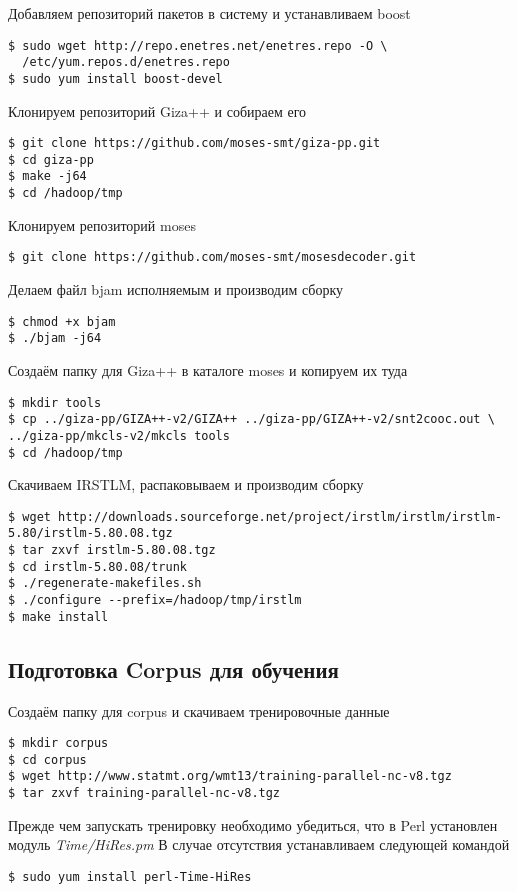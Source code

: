 Добавляем репозиторий пакетов в систему и устанавливаем boost
\begin{lstlisting}
$ sudo wget http://repo.enetres.net/enetres.repo -O \
  /etc/yum.repos.d/enetres.repo
$ sudo yum install boost-devel
\end{lstlisting}

Клонируем репозиторий Giza++ и собираем его
\begin{lstlisting}
$ git clone https://github.com/moses-smt/giza-pp.git
$ cd giza-pp
$ make -j64
$ cd /hadoop/tmp
\end{lstlisting}

Клонируем репозиторий moses
\begin{lstlisting}
$ git clone https://github.com/moses-smt/mosesdecoder.git
\end{lstlisting}
Делаем файл bjam исполняемым и производим сборку
\begin{lstlisting}
$ chmod +x bjam
$ ./bjam -j64
\end{lstlisting}

Создаём папку для Giza++ в каталоге moses и копируем их туда
\begin{lstlisting}
$ mkdir tools
$ cp ../giza-pp/GIZA++-v2/GIZA++ ../giza-pp/GIZA++-v2/snt2cooc.out \
../giza-pp/mkcls-v2/mkcls tools
$ cd /hadoop/tmp
\end{lstlisting}

Скачиваем IRSTLM, распаковываем и производим сборку
\begin{lstlisting}
$ wget http://downloads.sourceforge.net/project/irstlm/irstlm/irstlm-5.80/irstlm-5.80.08.tgz
$ tar zxvf irstlm-5.80.08.tgz
$ cd irstlm-5.80.08/trunk
$ ./regenerate-makefiles.sh
$ ./configure --prefix=/hadoop/tmp/irstlm
$ make install
\end{lstlisting}

\subsection{Подготовка Corpus для обучения}
Создаём папку для corpus и скачиваем тренировочные данные
\begin{lstlisting}
$ mkdir corpus
$ cd corpus
$ wget http://www.statmt.org/wmt13/training-parallel-nc-v8.tgz
$ tar zxvf training-parallel-nc-v8.tgz
\end{lstlisting}

Прежде чем запускать тренировку необходимо убедиться, что в Perl установлен модуль \emph{Time/HiRes.pm}
В случае отсутствия устанавливаем следующей командой
\begin{lstlisting}
$ sudo yum install perl-Time-HiRes
\end{lstlisting}

